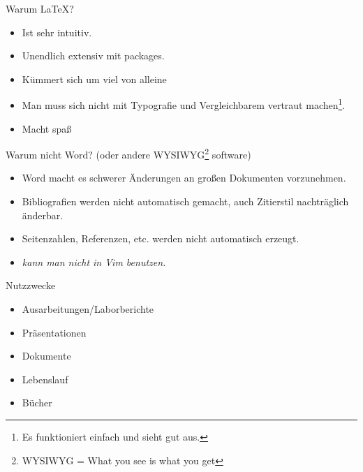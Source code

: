 \documentclass{beamer}
\begin{document}
\begin{frame}{Warum \LaTeX?}
    \begin{itemize}
        \item Ist sehr intuitiv.
        \item Unendlich extensiv mit packages.
        \item K\"ummert sich um viel von alleine
        \item Man muss sich nicht mit Typografie und Vergleichbarem vertraut machen\footnote{Es funktioniert einfach und sieht gut aus.}.
        \item Macht spa\ss
    \end{itemize}
\end{frame}



\begin{frame}{Warum nicht Word? (oder andere WYSIWYG\footnote{WYSIWYG = What you see is what you get} software)}
    \begin{itemize}
        \item Word macht es schwerer \"Anderungen an gro\ss{}en Dokumenten vorzunehmen.
        \item Bibliografien werden nicht automatisch gemacht, auch Zitierstil nachtr\"aglich \"anderbar.
        \item Seitenzahlen, Referenzen, etc. werden nicht automatisch erzeugt.
        \item \textit{kann man nicht in Vim benutzen.}
    \end{itemize}
    
\end{frame}




\begin{frame}{Nutzzwecke}

    \begin{itemize}
        \item Ausarbeitungen/Laborberichte
        \item Pr\"asentationen
        \item Dokumente
        \item Lebenslauf
        \item B\"ucher
    \end{itemize}
\end{frame}
\end{document}
